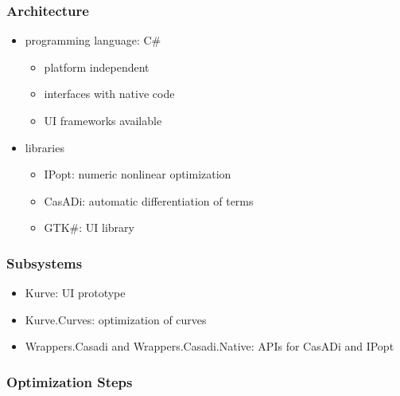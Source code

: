 \documentclass[mathserif]{beamer}
\begin{document}
		\begin{frame}
			\frametitle{Architecture}
			\begin{itemize}
				\item programming language: C\#
				\begin{itemize}
					\item platform independent
					\item interfaces with native code
					\item UI frameworks available
				\end{itemize}
				\item libraries
				\begin{itemize}
					\item IPopt: numeric nonlinear optimization
					\item CasADi: automatic differentiation of terms
					\item GTK\#: UI library
				\end{itemize}
			\end{itemize}
		\end{frame}
		
		\begin{frame}
			\frametitle{Subsystems}
			\begin{itemize}
				\item Kurve: UI prototype
				\item Kurve.Curves: optimization of curves
				\item Wrappers.Casadi and Wrappers.Casadi.Native: APIs for CasADi and IPopt
			\end{itemize}
		\end{frame}
		
		\begin{frame}
			\frametitle{Optimization Steps}
			\\
		\end{frame}
		
\end{document}
